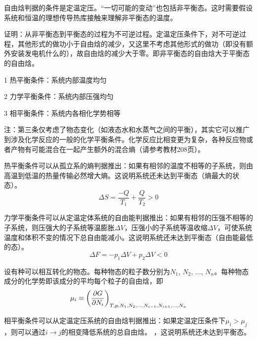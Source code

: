 \documentclass[CJK]{beamer}
\begin{document}
\begin{frame}
\bch
自由焓判据的条件是定温定压。“一切可能的变动”也包括非平衡态。这时需要假设系统和恒温的理想传导热库接触来理解非平衡态的温度。


证明：从非平衡态到平衡态的过程为不可逆过程。定温定压条件下，对不可逆过程，其他形式的做功小于自由焓的减少，又这里不考虑其他形式的做功（即没有额外安装发电机什么的），故自由焓的减少大于零。即非平衡态的自由焓大于平衡态的自由焓。

\ech
\end{frame}

\begin{frame}
\bch
\bitem
\item[1]{\blue 热平衡条件：系统内部温度均匀}
\item[2]{\blue 力学平衡条件：系统内部压强均匀}
\item[3]{\blue 相平衡条件：系统内各相化学势相等}
\eitem

{\scriptsize
注：第三条仅考虑了物态变化（如液态水和水蒸气之间的平衡），其实它可以推广到涉及化学反应的一般的化学平衡条件。化学反应比相变更为复杂，各种反应物或者产物有可能混合在一起产生额外的混合熵（请参考教材208页）。
}
\ech
\end{frame}


\begin{frame}
\bch
热平衡条件可以从孤立系的熵判据推出：如果有相邻的温度不相等的子系统，则由高温到低温的热量传输必然增大熵。这说明系统还未达到平衡态（熵最大的状态）。
$$\Delta S = \frac{-Q}{T_1} + \frac{Q}{T_2} > 0$$
\ech
\end{frame}

\begin{frame}
\bch
力学平衡条件可以从定温定体系统的自由能判据推出：如果有相邻的压强不相等的子系统，则压强大的子系统等温膨胀$\Delta V$，压强小的子系统等温收缩$\Delta V$，可使系统温度和体积不变的情况下总自由能减小。这说明系统还未达到平衡态（自由能最低的态）。
$$\Delta F = -p_1 \Delta V + p_2 \Delta V < 0 $$
\ech
\end{frame}


\begin{frame}
\bch
设有种可以相互转化的物态。每种物态的粒子数分别为$N_1$, $N_2$, $\ldots$, $N_n$。每种物态成分的化学势即该成分的平均每个粒子的自由焓，即
$$ \mu_i \equiv \left(\frac{\partial G}{\partial N_i}\right)_{T,p,N_1, N_2, \ldots, N_{i-1}, N_{i+1}, \ldots, N_n} $$


相平衡条件可以从定温定压系统的自由焓判据推出：如果定温定压条件下$ \mu_i > \mu_j$，则可以通过$i\rightarrow j$的相变降低系统的总自由焓。
，这说明系统还未达到平衡态。
\ech
\end{frame}
\end{document}
